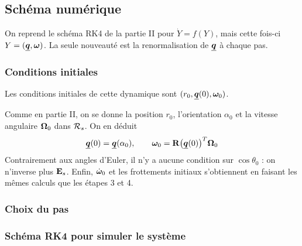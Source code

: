 \subsection{Schéma numérique}

On reprend le schéma RK4 de la partie II pour $\dot Y = f(Y)$, mais
cette fois-ci $Y = (\underline{\bm{q}},\bm{\omega})$. La seule nouveauté est la
renormalisation de $\underline{\bm{q}}$ à chaque pas.

\subsubsection{Conditions initiales}

\begin{proposition}
    Les conditions initiales de cette dynamique sont
    $(r_0, \underline{\bm{q}}(0), \bm{\omega}_0)$.
\end{proposition}

Comme en partie II, on se donne la position $r_0$, l'orientation
$\alpha_0$ et la vitesse angulaire $\bm{\Omega}_0$ dans $\mathcal{R}_{s}$.
On en déduit
\[
    \underline{\bm{q}}(0) = \underline{\bm{q}}(\alpha_0),
    \qquad
    \bm{\omega}_0 = \mathbf{R}\bigl(\underline{\bm{q}}(0)\bigr)^T\bm{\Omega}_0
\]
Contrairement aux angles d'Euler, il n'y a aucune condition sur
$\cos\theta_0$ : on n'inverse plus $\mathbf{E}_s$. Enfin,
$\dot{\bm{\omega}}_0$ et les frottements initiaux s'obtiennent en
faisant les mêmes calculs que les étapes 3 et 4.

\subsubsection{Choix du pas}

\subsubsection{Schéma RK4 pour simuler le système}

